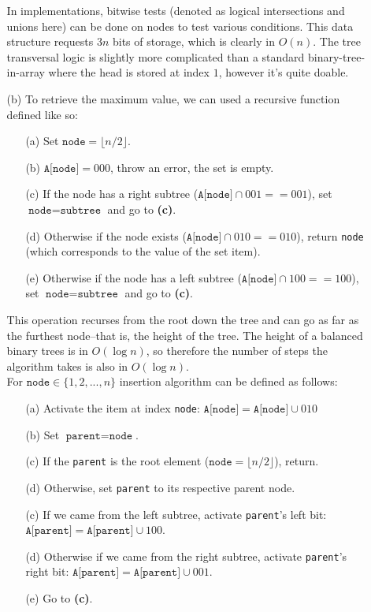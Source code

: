 \documentclass{article}
\begin{document}
\begin{enumerate}
\begin{enumerate}
        In implementations, bitwise tests (denoted as logical intersections and unions here) can be done on nodes to test various conditions. This data structure requests $3n$ bits of storage, which is clearly in $O(n)$. The tree transversal logic is slightly more complicated than a standard binary-tree-in-array where the head is stored at index $1$, however it's quite doable.

        \item [(b)] To retrieve the maximum value, we can used a recursive function defined like so:
            \begin{enumerate}
            \item [(a)] Set $\texttt{node} = \lfloor n / 2 \rfloor$.
            \item [(b)] $\texttt{A[node]} = 000$, throw an error, the set is empty.
            \item [(c)] If the node has a right subtree ($\texttt{A[node]} \cap 001 == 001$), set $\texttt{node} = \texttt{subtree}$ and go to \textbf{(c)}.
            \item [(d)] Otherwise if the node exists ($\texttt{A[node]} \cap 010 == 010$), return \texttt{node} (which corresponds to the value of the set item).
            \item [(e)] Otherwise if the node has a left subtree ($\texttt{A[node]} \cap 100 == 100$), set $\texttt{node} = \texttt{subtree}$ and go to \textbf{(c)}.
            \end{enumerate}
            This operation recurses from the root down the tree and can go as far as the furthest node--that is, the height of the tree. The height of a balanced binary trees is in $O(\log n)$, so therefore the number of steps the algorithm takes is also in $O(\log n)$. \\

            For $\texttt{node} \in \{1, 2, ..., n\}$ insertion algorithm can be defined as follows:
            \begin{enumerate}
            \item [(a)] Activate the item at index \texttt{node}: $\texttt{A[node]} = \texttt{A[node]} \cup 010$
            \item [(b)] Set $\texttt{parent} = \texttt{node}$.
            \item [(c)] If the \texttt{parent} is the root element ($\texttt{node} = \lfloor n / 2 \rfloor$), return.
            \item [(d)] Otherwise, set \texttt{parent} to its respective parent node.
            \item [(c)] If we came from the left subtree, activate \texttt{parent}'s left bit: $\texttt{A[parent]} = \texttt{A[parent]} \cup 100$.
            \item [(d)] Otherwise if we came from the right subtree, activate \texttt{parent}'s right bit: $\texttt{A[parent]} = \texttt{A[parent]} \cup 001$.
            \item [(e)] Go to \textbf{(c)}.
            \end{enumerate}


\end{enumerate}
\end{enumerate}
\end{document}
